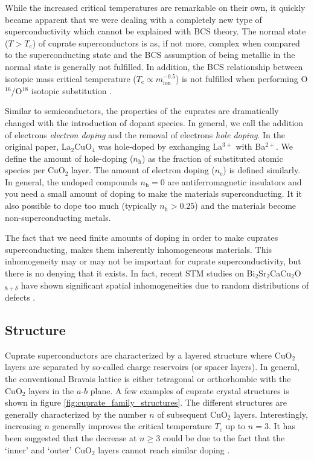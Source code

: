 While the increased critical temperatures are remarkable on their own, it quickly became apparent that we were dealing with a completely new type of superconductivity which cannot be explained with BCS theory. The normal state ($T > T_\text{c}$) of cuprate superconductors is as, if not more, complex when compared to the superconducting state and the BCS assumption of being metallic in the normal state is generally not fulfilled. In addition, the BCS relationship between isotopic mass critical temperature ($T_\text{c} \propto m_\text{ion}^{-0.5}$) is not fulfilled when performing O$^{16}$/O$^{18}$ isotopic substitution \cite{Suryadijaya2005}.

Similar to semiconductors, the properties of the cuprates are dramatically changed with the introduction of dopant species. In general, we call the addition of electrons \emph{electron doping} and the removal of electrons \emph{hole doping}. In the original paper, La$_2$CuO$_4$ was hole-doped by exchanging La$^{3+}$ with Ba$^{2+}$. We define the amount of hole-doping ($n_\text{h}$) as the fraction of substituted atomic species per CuO$_2$ layer. The amount of electron doping ($n_\text{e}$) is defined similarly. In general, the undoped compounds $n_\text{h} = 0$ are antiferromagnetic insulators and you need a small amount of doping to make the materials superconducting. It it also possible to dope too much (typically $n_\text{h} > 0.25$) and the materials become non-superconducting metals. 

The fact that we need finite amounts of doping in order to make cuprates superconducting, makes them inherently inhomogeneous materials. This inhomogeneity may or may not be important for cuprate superconductivity, but there is no denying that it exists. In fact, recent STM studies on Bi$_2$Sr$_2$CaCu$_2$O$_{8+\delta}$ have shown significant spatial inhomogeneities due to random distributions of defects \cite{Ruan2018}. %

\subsection{Structure}
Cuprate superconductors are characterized by a layered structure where CuO$_2$ layers are separated by so-called charge reservoirs (or spacer layers). In general, the conventional Bravais lattice is either tetragonal or orthorhombic with the CuO$_2$ layers in the $a$-$b$ plane. A few examples of cuprate crystal structures is shown in figure \ref{fig:cuprate_family_structures}. The different structures are generally characterized by the number $n$ of subsequent CuO$_2$ layers. Interestingly, increasing $n$ generally improves the critical temperature $T_\text{c}$ up to $n = 3$. It has been suggested that the decrease at $n \geq 3$ could be due to the fact that the `inner' and `outer' CuO$_2$ layers cannot reach similar doping \cite{Wesche2017}.

